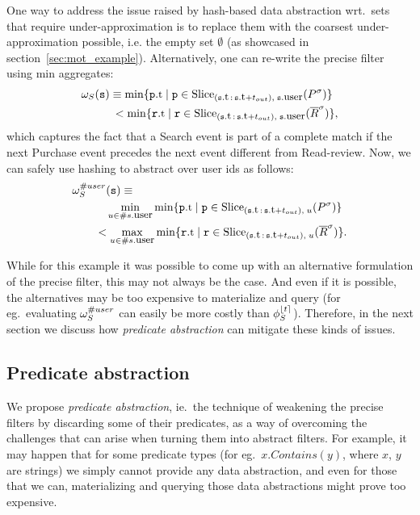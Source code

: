 One way to address the issue raised by hash-based data abstraction wrt.\ sets 
that require under-approximation is to replace them with the coarsest 
under-approximation possible, i.e. the empty set $\emptyset$ (as showcased in 
section~\ref{sec:mot_example}).
Alternatively, one can re-write the precise filter using min aggregates:
\begin{align*}
&
\PrecedesPP(\symv{s}) \equiv 
\min \{ 
\facc{\symv{p}}{t} \mid 
\symv{p} \in 
\slice{\syms{P}}
{(\facc{\symv{s}}{t}\,:\,\facc{\symv{s}}{t} + t_{out}),\; 
	\facc{\symv{s}}{user}}
\}
\\
&\qquad\;\;\,
< \min \{ 
\facc{\symv{r}}{t} \mid 
\symv{r} \in 
\slice{\syms{\oR}}
{(\facc{\symv{s}}{t}\,:\,\facc{\symv{s}}{t} + t_{out}),\; 
	\facc{\symv{s}}{user}} 
\},
\end{align*}
which captures the fact that a Search event is part of a complete match if the 
next Purchase event precedes the next event different from Read-review.
Now, we can safely use hashing to abstract over user ids as follows:
\begin{align*}
&
\PrecedesPP^{\hashid{user}}(\symv{s}) \equiv 
\\
&\qquad\;\;\;\,
\min_{u \in \hashid{\facc{s}{user}}}
\min \{ 
\facc{\symv{p}}{t} \mid 
\symv{p} \in 
\slice{\syms{P}}
{(\facc{\symv{s}}{t}\,:\,\facc{\symv{s}}{t} + t_{out}),\; 
	u}
\}
\\
&\qquad
< 
\max_{u \in \hashid{\facc{s}{user}}}
\min \{ 
\facc{\symv{r}}{t} \mid 
\symv{r} \in 
\slice{\syms{\oR}}
{(\facc{\symv{s}}{t}\,:\,\facc{\symv{s}}{t} + t_{out}),\; 
	u} 
\}.
\end{align*}

While for this example it was possible to come up with an alternative 
formulation of the precise filter, this may not always be the case. 
And even if it is possible, the alternatives may be too expensive to
materialize and query (for eg.\ evaluating $\omega_S^{\# user}$ can 
easily be more costly than $\phi_{S}^{\lfloor t \rceil}$).
Therefore, in the next section we discuss how {\em predicate abstraction} can 
mitigate these kinds of issues.

\subsection{Predicate abstraction}
\label{sec:pred_abstraction}


We propose {\em predicate abstraction}, ie.\ the technique of weakening
 the
precise filters by discarding some of their predicates, as a way of
 overcoming
the challenges that can arise when turning them into abstract 
filters.
For example, it may happen that for some predicate types
(for eg.\ $x.Contains(y)$, where $x$, $y$ are strings) we simply cannot
 provide
any data abstraction, and even for those that we can, materializing and
 querying
those data abstractions might prove too expensive.




